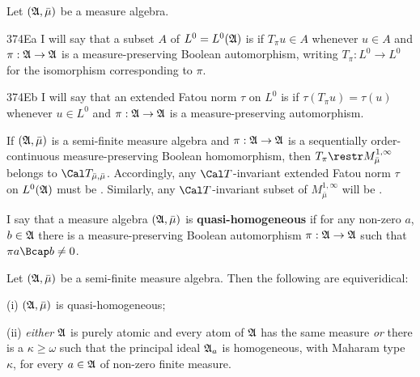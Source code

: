 Let $(\frak A,\bar\mu)$ be a measure algebra.

\spheader 374Ea I will say that a subset $A$ of $L^0=L^0(\frak A)$ is
{\bf \ri} if $T_{\pi}u\in A$ whenever $u\in A$ and
$\pi:\frak A\to\frak A$ is a measure-preserving Boolean automorphism,
writing $T_{\pi}:L^0\to L^0$ for the isomorphism corresponding to
$\pi$.

\spheader 374Eb I will say that an extended Fatou norm $\tau$ on $L^0$
is {\bf \ri} if $\tau(T_{\pi}u)=\tau(u)$ whenever
$u\in L^0$ and $\pi:\frak A\to\frak A$ is a measure-preserving
automorphism.

 If $(\frak A,\bar\mu)$ is a
semi-finite measure algebra
and $\pi:\frak A\to\frak A$ is a sequentially order-continuous
measure-preserving Boolean homomorphism, then
$T_{\pi}\restr M^{1,\infty}_{\bar\mu}$ belongs to
$\Cal T_{\bar\mu,\bar\mu}$.   Accordingly, any $\Cal T$-invariant extended Fatou norm
$\tau$ on $L^0(\frak A)$ must be \ri{}.   Similarly, any $\Cal T$-invariant
subset of $M^{1,\infty}_{\bar\mu}$ will be \ri.


 I say that a measure algebra
$(\frak A,\bar\mu)$ is {\bf quasi-homogeneous} if for any non-zero $a$,
$b\in\frak A$ there is a measure-preserving Boolean automorphism
$\pi:\frak A\to\frak A$ such that $\pi a\Bcap b\ne 0$.

 Let $(\frak A,\bar\mu)$ be a semi-finite
measure algebra.   Then the following are equiveridical:

(i) $(\frak A,\bar\mu)$ is quasi-homogeneous;

(ii) {\it either} $\frak A$ is purely atomic and every atom of $\frak A$
has the same measure {\it or} there is a $\kappa\ge\omega$ such that the
principal ideal $\frak A_a$ is homogeneous, with Maharam type $\kappa$,
for every $a\in\frak A$ of non-zero finite measure.

